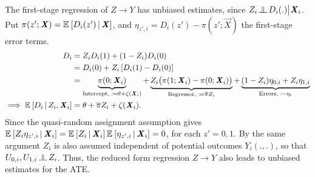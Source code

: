 The first-stage regression of $Z \to Y$ has unbiased estimates, since $Z_i \indep D_i(.) \big| \vec X_i$.
Put $\pi(z'; \boldsymbol{\mathit{X}}) = \mathbb{E}_{} \left[ D_i(z') \, \middle\vert \, \boldsymbol{\mathit{X}} \right]$, and $\eta_{z', i} = D_i(z') - \pi(z'; \vec X)$ the first-stage error terms.
\begin{align*}
    D_i &= Z_i D_i(1) + (1 - Z_i) D_i(0) \\
        &= D_i(0) +
            Z_i \left[ D_i(1) - D_i(0) \right] \\
        &= \underbrace{\pi(0; \boldsymbol{\mathit{X}}_i) 
        }_{\text{Intercept, } \coloneqq \theta + \zeta(\boldsymbol{\mathit{X}}_i)} +
            \underbrace{Z_i \big( \pi(1; \boldsymbol{\mathit{X}}_i) - \pi(0; \boldsymbol{\mathit{X}}_i) \big)}_{
                \text{Regressor, } \coloneqq \overline{\pi} Z_i }
        + \underbrace{(1- Z_i) \eta_{0,i} + Z_i \eta_{1,i}}_{
            \text{Errors, } \coloneqq \eta_i} \\
    \implies \mathbb{E}_{} \left[ D_i \, \middle\vert \, Z_i, \boldsymbol{\mathit{X}}_i \right]
        &= \theta + \overline{\pi} Z_i + \zeta(\boldsymbol{\mathit{X}}_i).
\end{align*}
Since the quasi-random assignment assumption gives $\mathbb{E}_{} \left[ Z_i \eta_{z',i} \, \middle\vert \, \boldsymbol{\mathit{X}}_i \right] = \mathbb{E}_{} \left[ Z_i \, \middle\vert \, \boldsymbol{\mathit{X}}_i \right] \mathbb{E}_{} \left[ \eta_{z',i} \, \middle\vert \, \boldsymbol{\mathit{X}}_i \right] = 0$, for each $z' =0,1$.
By the same argument $Z_i$ is also assumed independent of potential outcomes $Y_i(.,.)$, so that $U_{0,i}, U_{1,i} \indep Z_i$.
Thus, the reduced form regression $Z \to Y$ also leads to unbiased estimates for the ATE.

